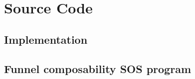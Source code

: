 \chapter{Source Code}
\label{AppendixB}
\section{Implementation}

\section{Funnel composability SOS program}
\label{sec:funnel-composability-program-sos}

